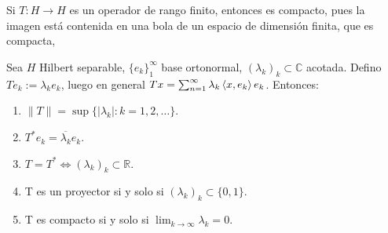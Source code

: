 \begin{remark}
  Si $T:H\to H$ es un operador de rango finito, entonces es compacto, pues la
  imagen está contenida en una bola de un espacio de dimensión finita, que es
  compacta, 
\end{remark}

\begin{proposition}
  \label{prop:diagonal-operator-properties}
  Sea $H$ Hilbert separable, $\{e_k\}_1^\infty$ base ortonormal,
  $(\lambda_k)_k \subset \mathbb{C}$ acotada. Defino $Te_k:=\lambda_k e_k$,
  luego en general $Tx=\sum_{n=1}^{\infty} \lambda_k \left\langle x,e_k\right\rangle e_k$.
  Entonces:

  \begin{enumerate}
    \item $\|T\|=\sup \{|\lambda_k|:k=1,2,\ldots\} $.
    \item $T^* e_k=\overline{\lambda_k}e_k$.
    \item $T=T^* \iff (\lambda_k)_k\subset \mathbb{R}$.
    \item T es un proyector si y solo si $(\lambda_k)_k\subset \{0,1\} $.
    \item T es compacto si y solo si  $\lim_{k \to \infty} \lambda_k=0$.
  \end{enumerate}
\end{proposition}

